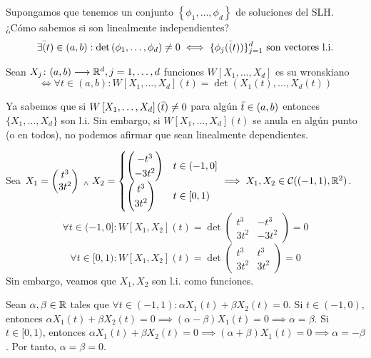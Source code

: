 Supongamos que tenemos un conjunto $\left\{\phi_1, \dots, \phi_d\right\}$ de soluciones del SLH. ¿Cómo sabemos si son linealmente independientes?
\[\exists \Bar(t) \in (a,b) : \det{\left(\phi_1, \dots, \phi_d\right)} \neq 0 \iff \{\phi_j(\Bar(t))\}_{j=1}^d\text{ son vectores l.i.}\]

\begin{defn}[Wronskiano]
	Sean $X_j \colon (a,b) \longrightarrow \mathbb{R}^d, j=1, \dots, d$ funciones $W\left[X_1, \dots, X_d\right]$ es su wronskiano
	\[\iff \forall t \in (a,b) : W\left[X_1, \dots, X_d\right](t) = \det{\left(X_1(t), \dots, X_d(t)\right)}\]
\end{defn}

Ya sabemos que si $W\left[X_1, \dots, X_d\right](\Bar{t}) \neq 0$ para algún $\Bar{t}\in(a,b)$ entonces $\{X_1, \dots, X_d\}$ son l.i. Sin embargo, si $W\left[X_1, \dots, X_d\right](t)$ se anula en algún punto (o en todos), no podemos afirmar que sean linealmente dependientes.

\begin{ejem}
	Sea $X_1 = \begin{pmatrix}
			t^3 \\
			3t^2
		\end{pmatrix} \; _{\wedge} \; X_2 = \begin{cases}
			\begin{pmatrix}
				-t^3 \\
				-3t^2
			\end{pmatrix} & t \in (-1, 0] \\
			\begin{pmatrix}
					t^3 \\
					3t^2
				\end{pmatrix} & t \in [0, 1)
		\end{cases} \implies X_1, X_2 \in \mathcal{C}((-1, 1), \mathbb{R}^2)$.
	\[\forall t \in (-1, 0] : W\left[X_1, X_2\right](t) = \det{\begin{pmatrix}
					t^3  & -t^3  \\
					3t^2 & -3t^2
				\end{pmatrix}} = 0\]
		\[\forall t \in [0, 1) : W\left[X_1, X_2\right](t) = \det{\begin{pmatrix}
				t^3  & t^3  \\
				3t^2 & 3t^2
			\end{pmatrix}} = 0\]
	Sin embargo, veamos que $X_1, X_2$ son l.i. como funciones.

	Sean $\alpha, \beta \in \mathbb{R}$ tales que $\forall t \in (-1, 1) :\alpha X_1(t) + \beta X_2(t) = 0$. Si $t \in (-1, 0)$, entonces $\alpha X_1(t) + \beta X_2(t) = 0 \implies (\alpha - \beta)X_1(t) = 0 \implies \alpha = \beta$. Si $t \in [0, 1)$, entonces $\alpha X_1(t) + \beta X_2(t) = 0 \implies (\alpha + \beta)X_1(t) = 0 \implies \alpha = -\beta$. Por tanto, $\alpha = \beta = 0$.
\end{ejem}

